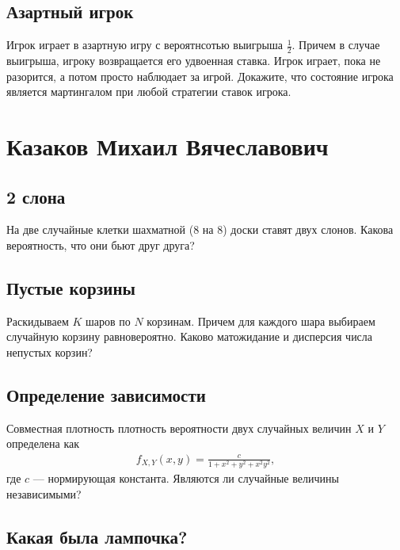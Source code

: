 \documentclass[12pt]{article}
\begin{document}
\subsection{Азартный игрок}

Игрок играет в азартную игру с вероятнсотью выигрыша $\frac{1}{2}$. Причем в случае выигрыша, игроку возвращается его удвоенная ставка. Игрок играет, пока не разорится, а потом просто наблюдает за игрой. Докажите, что состояние игрока является мартингалом при любой стратегии ставок игрока.



\newpage
\section{Казаков Михаил Вячеславович}

\subsection{2 слона}

На две случайные клетки шахматной (8 на 8) доски ставят двух слонов. Какова вероятность, что они бьют друг друга?



\subsection{Пустые корзины}

Раскидываем $K$ шаров по $N$ корзинам. Причем для каждого шара выбираем случайную корзину равновероятно. Каково матожидание и дисперсия числа непустых корзин?



\subsection{Определение зависимости}

Совместная плотность плотность вероятности двух случайных величин $X$ и $Y$ определена как
\begin{align*}
    f_{X, Y}(x, y) = \frac{c}{1 + x^2 + y^2 + x^2y^2},
\end{align*}
где $c$ --- нормирующая константа. Являются ли случайные величины независимыми?



\subsection{Какая была лампочка?}
\end{document}
